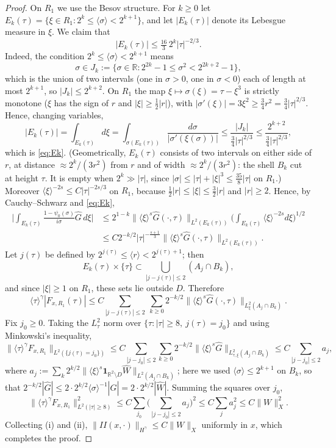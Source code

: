\documentclass[10pt,reqno]{amsart}
\theoremstyle{remark}
\numberwithin{equation}{section}
\newcommand{\R}{\mathbb R}
\newcommand{\ga}{\gamma}
\newcommand{\lan}{\langle}
\newcommand{\ran}{\rangle}
\newcommand{\sig}{\sigma}
\begin{document}
\begin{proof}
On $R_1$ we use the Besov structure. For $k\ge0$ let $E_k(\tau)=\{\xi\in R_1:2^k\le\lan\sig\ran<2^{k+1}\}$, and let $|E_k(\tau)|$ denote its Lebesgue measure in $\xi$. We claim that
\begin{equation}\label{eq:Ek}
|E_k(\tau)|\le \tfrac{16}{3}\,2^{k}|\tau|^{-2/3}.
\end{equation}
Indeed, the condition $2^k\le\lan\sig\ran<2^{k+1}$ means $$\sig\in J_k:=\{\sig\in\R: 2^{2k}-1\le\sig^2<2^{2k+2}-1\},$$ which is the union of two intervals (one in $\sig>0$, one in $\sig<0$) each of length at most $2^{k+1}$, so $|J_k|\le2^{k+2}$. On $R_1$ the map $\xi\mapsto\sig(\xi)=\tau-\xi^3$ is strictly monotone ($\xi$ has the sign of $r$ and $|\xi|\ge\frac12|r|$), with $|\sig'(\xi)|=3\xi^2\ge\frac34r^2=\frac34|\tau|^{2/3}$. Hence, changing variables,
$$
|E_k(\tau)|=\int_{E_k(\tau)}d\xi=\int_{\sig(E_k(\tau))}\frac{d\sig}{|\sig'(\xi(\sig))|}\le\frac{|J_k|}{\frac34|\tau|^{2/3}}\le\frac{2^{k+2}}{\frac34|\tau|^{2/3}},
$$
which is \eqref{eq:Ek}. (Geometrically, $E_k(\tau)$ consists of two intervals on either side of $r$, at distance $\approx2^k/(3r^2)$ from $r$ and of width $\approx2^k/(3r^2)$: the shell $B_k$ cut at height $\tau$. It is empty when $2^k\gg|\tau|$, since $|\sig|\le|\tau|+|\xi|^3\le\frac{35}{8}|\tau|$ on $R_1$.) Moreover $\lan\xi\ran^{-2s}\le C|\tau|^{-2s/3}$ on $R_1$, because $\frac12|r|\le|\xi|\le\frac32|r|$ and $|r|\ge2$. Hence, by Cauchy--Schwarz and \eqref{eq:Ek},
\begin{equation}
\begin{split}
\Big|\int_{E_k(\tau)}\frac{1-\psi_0(\sig)}{i\sig}\widehat G\,d\xi\Big|&\le 2^{1-k}\|\lan\xi\ran^s\widehat G(\cdot,\tau)\|_{L^2(E_k(\tau))}\Big(\int_{E_k(\tau)}\lan\xi\ran^{-2s}d\xi\Big)^{1/2}
\\&\le C2^{-k/2}|\tau|^{-\frac{s+1}3}\|\lan\xi\ran^s\widehat G(\cdot,\tau)\|_{L^2(E_k(\tau))}.
\end{split}
\end{equation}
Let $j(\tau)$ be defined by $2^{j(\tau)}\le\lan r\ran<2^{j(\tau)+1}$; then $$E_k(\tau)\times\{\tau\}\subset\bigcup_{|j-j(\tau)|\le2}(A_j\cap B_k),$$ and since $|\xi|\ge1$ on $R_1$, these sets lie outside $D$. Therefore
$$\lan\tau\ran^\ga|F_{x,R_1}(\tau)|\le C\sum_{|j-j(\tau)|\le2}\ \sum_{k\ge0}2^{-k/2}\|\lan\xi\ran^s\widehat G(\cdot,\tau)\|_{L^2_\xi(A_j\cap B_k)} .$$
Fix $j_0\ge0$. Taking the $L^2_\tau$ norm over $\{\tau:|\tau|\ge8,\ j(\tau)=j_0\}$ and using Minkowski's inequality,
$$\big\|\lan\tau\ran^\ga F_{x,R_1}\big\|_{L^2(\{j(\tau)=j_0\})}\le C\sum_{|j-j_0|\le2}\sum_{k\ge0}2^{-k/2}\|\lan\xi\ran^s\widehat G\|_{L^2_{\tau,\xi}(A_j\cap B_k)}\le C\sum_{|j-j_0|\le2}a_j,$$
where $a_j:=\sum_k2^{k/2}\|\lan\xi\ran^s\mathbf 1_{\R^2\setminus D}\widehat W\|_{L^2(A_j\cap B_k)}$; here we used $\lan\sig\ran\le2^{k+1}$ on $B_k$, so that $2^{-k/2}|\widehat G|\le 2\cdot 2^{k/2}\lan\sig\ran^{-1}|\widehat G|=2\cdot2^{k/2}|\widehat W|$. Summing the squares over $j_0$,
$$\big\|\lan\tau\ran^\ga F_{x,R_1}\big\|_{L^2(|\tau|\ge8)}^2\le C\sum_{j_0}\Big(\sum_{|j-j_0|\le2}a_j\Big)^2\le C\sum_ja_j^2\le C\|W\|_X^2 .$$
Collecting (i) and (ii), $\|II(x,\cdot)\|_{H^\ga}\le C\|W\|_X$ uniformly in $x$, which completes the proof.
\end{proof}
\end{document}
